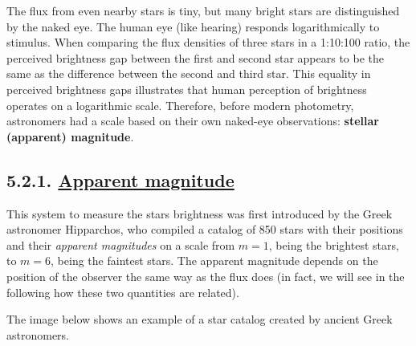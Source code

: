 \documentclass[
  letterpaper,
  DIV=11,
  numbers=noendperiod]{scrreprt}
\begin{document}
The flux from even nearby stars is tiny, but many bright stars are
distinguished by the naked eye. The human eye (like hearing) responds
logarithmically to stimulus. When comparing the flux densities of three
stars in a 1:10:100 ratio, the perceived brightness gap between the
first and second star appears to be the same as the difference between
the second and third star. This equality in perceived brightness gaps
illustrates that human perception of brightness operates on a
logarithmic scale. Therefore, before modern photometry, astronomers had
a scale based on their own naked-eye observations: \textbf{stellar
(apparent) magnitude}.

\hypertarget{apparent-magnitude}{%
\subsection{\texorpdfstring{5.2.1. \protect\hyperlink{toc0_}{Apparent
magnitude}}{5.2.1. Apparent magnitude}}\label{apparent-magnitude}}

This system to measure the stars brightness was first introduced by the
Greek astronomer Hipparchos, who compiled a catalog of 850 stars with
their positions and their \emph{apparent magnitudes} on a scale from
\(m=1\), being the brightest stars, to \(m=6\), being the faintest
stars. The apparent magnitude depends on the position of the observer
the same way as the flux does (in fact, we will see in the following how
these two quantities are related).

The image below shows an example of a star catalog created by ancient
Greek astronomers.
\end{document}
